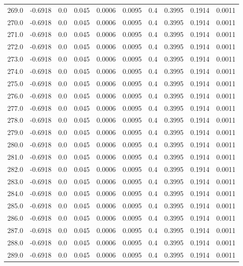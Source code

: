 \begin{longtable}{lrrrrrrrrr}
269.0 & -0.6918 & 0.0 & 0.045 & 0.0006 & 0.0095 & 0.4 & 0.3995 & 0.1914 & 0.0011 \\
270.0 & -0.6918 & 0.0 & 0.045 & 0.0006 & 0.0095 & 0.4 & 0.3995 & 0.1914 & 0.0011 \\
271.0 & -0.6918 & 0.0 & 0.045 & 0.0006 & 0.0095 & 0.4 & 0.3995 & 0.1914 & 0.0011 \\
272.0 & -0.6918 & 0.0 & 0.045 & 0.0006 & 0.0095 & 0.4 & 0.3995 & 0.1914 & 0.0011 \\
273.0 & -0.6918 & 0.0 & 0.045 & 0.0006 & 0.0095 & 0.4 & 0.3995 & 0.1914 & 0.0011 \\
274.0 & -0.6918 & 0.0 & 0.045 & 0.0006 & 0.0095 & 0.4 & 0.3995 & 0.1914 & 0.0011 \\
275.0 & -0.6918 & 0.0 & 0.045 & 0.0006 & 0.0095 & 0.4 & 0.3995 & 0.1914 & 0.0011 \\
276.0 & -0.6918 & 0.0 & 0.045 & 0.0006 & 0.0095 & 0.4 & 0.3995 & 0.1914 & 0.0011 \\
277.0 & -0.6918 & 0.0 & 0.045 & 0.0006 & 0.0095 & 0.4 & 0.3995 & 0.1914 & 0.0011 \\
278.0 & -0.6918 & 0.0 & 0.045 & 0.0006 & 0.0095 & 0.4 & 0.3995 & 0.1914 & 0.0011 \\
279.0 & -0.6918 & 0.0 & 0.045 & 0.0006 & 0.0095 & 0.4 & 0.3995 & 0.1914 & 0.0011 \\
280.0 & -0.6918 & 0.0 & 0.045 & 0.0006 & 0.0095 & 0.4 & 0.3995 & 0.1914 & 0.0011 \\
281.0 & -0.6918 & 0.0 & 0.045 & 0.0006 & 0.0095 & 0.4 & 0.3995 & 0.1914 & 0.0011 \\
282.0 & -0.6918 & 0.0 & 0.045 & 0.0006 & 0.0095 & 0.4 & 0.3995 & 0.1914 & 0.0011 \\
283.0 & -0.6918 & 0.0 & 0.045 & 0.0006 & 0.0095 & 0.4 & 0.3995 & 0.1914 & 0.0011 \\
284.0 & -0.6918 & 0.0 & 0.045 & 0.0006 & 0.0095 & 0.4 & 0.3995 & 0.1914 & 0.0011 \\
285.0 & -0.6918 & 0.0 & 0.045 & 0.0006 & 0.0095 & 0.4 & 0.3995 & 0.1914 & 0.0011 \\
286.0 & -0.6918 & 0.0 & 0.045 & 0.0006 & 0.0095 & 0.4 & 0.3995 & 0.1914 & 0.0011 \\
287.0 & -0.6918 & 0.0 & 0.045 & 0.0006 & 0.0095 & 0.4 & 0.3995 & 0.1914 & 0.0011 \\
288.0 & -0.6918 & 0.0 & 0.045 & 0.0006 & 0.0095 & 0.4 & 0.3995 & 0.1914 & 0.0011 \\
289.0 & -0.6918 & 0.0 & 0.045 & 0.0006 & 0.0095 & 0.4 & 0.3995 & 0.1914 & 0.0011 \\

\end{longtable}
